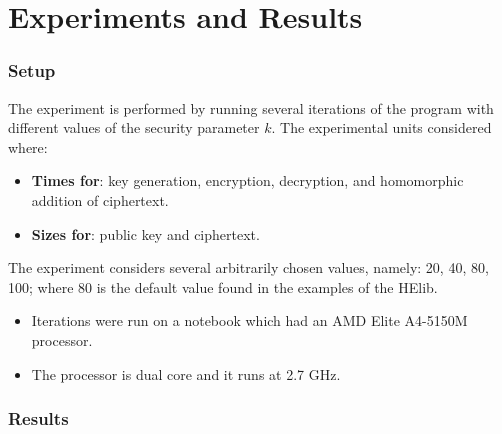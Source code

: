 \documentclass{beamer}
\begin{document}
\section{Experiments and Results}
\begin{frame}
\frametitle{Setup}
The experiment is performed by running several iterations of the program with different values of the security parameter $k$. The experimental units considered where: 
\begin{itemize}
\item \textbf{Times for}: key generation, encryption, decryption, and homomorphic addition of ciphertext. 
\item \textbf{Sizes for}: public key and ciphertext.
\end{itemize}

\vspace*{5mm} 
The experiment considers several arbitrarily chosen values, namely: 20, 40, 80, 100; where 80 is the default value found in the examples of the HElib.

\begin{itemize}
\item Iterations were run on a notebook which had an AMD Elite A4-5150M processor. 
\item The processor is dual core and it runs at 2.7 GHz. 
\end{itemize}
\end{frame}
\begin{frame}
\frametitle{Results}

\begin{table}[h]
  \caption{Experimental results}
  \label{tbl:results}
\end{table}

\end{frame}
\end{document}
